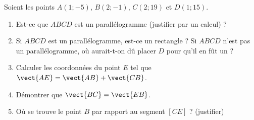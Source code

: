 
\begin{exercice}\label{exosmath-0670}

    Soient les points \( A(1;-5)\), \( B(2;-1)\), \( C(2;19)\) et \( D(1;15)\).
    \begin{enumerate}
        \item
            Est-ce que \( ABCD\) est un parallélogramme (justifier par un calcul) ?
        \item
            Si \( ABCD\) est un parallélogramme, est-ce un rectangle ? Si \( ABCD\) n'est pas un parallélogramme, où aurait-t-on dû placer \( D\) pour qu'il en fût un ?
        \item
            Calculer les coordonnées du point \( E\) tel que \( \vect{ AE }=\vect{ AB }+\vect{ CB }\).
        \item
            Démontrer que \( \vect{ BC }=\vect{ EB }\).
        \item
            Où se trouve le point \( B\) par rapport au segment \( [CE]\) ? (justifier)
    \end{enumerate}

\end{exercice}
